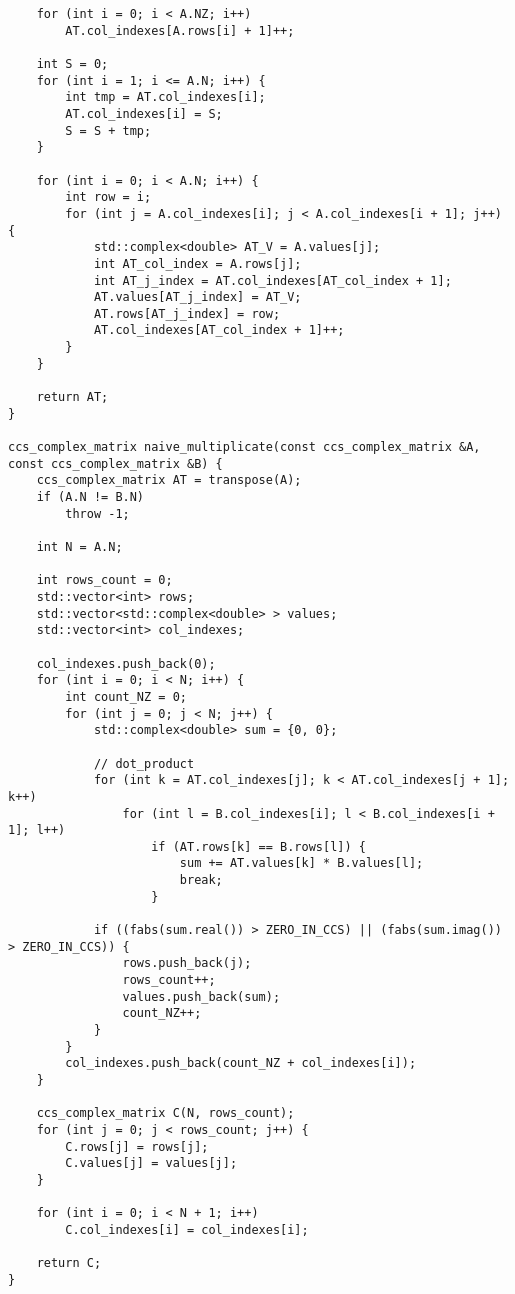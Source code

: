 \documentclass{report}
\begin{document}
\begin{itemize}
\begin{itemize}
\begin{lstlisting}
    for (int i = 0; i < A.NZ; i++)
        AT.col_indexes[A.rows[i] + 1]++;

    int S = 0;
    for (int i = 1; i <= A.N; i++) {
        int tmp = AT.col_indexes[i];
        AT.col_indexes[i] = S;
        S = S + tmp;
    }

    for (int i = 0; i < A.N; i++) {
        int row = i;
        for (int j = A.col_indexes[i]; j < A.col_indexes[i + 1]; j++) {
            std::complex<double> AT_V = A.values[j];
            int AT_col_index = A.rows[j];
            int AT_j_index = AT.col_indexes[AT_col_index + 1];
            AT.values[AT_j_index] = AT_V;
            AT.rows[AT_j_index] = row;
            AT.col_indexes[AT_col_index + 1]++;
        }
    }

    return AT;
}

ccs_complex_matrix naive_multiplicate(const ccs_complex_matrix &A, const ccs_complex_matrix &B) {
    ccs_complex_matrix AT = transpose(A);
    if (A.N != B.N)
        throw -1;

    int N = A.N;

    int rows_count = 0;
    std::vector<int> rows;
    std::vector<std::complex<double> > values;
    std::vector<int> col_indexes;

    col_indexes.push_back(0);
    for (int i = 0; i < N; i++) {
        int count_NZ = 0;
        for (int j = 0; j < N; j++) {
            std::complex<double> sum = {0, 0};

            // dot_product
            for (int k = AT.col_indexes[j]; k < AT.col_indexes[j + 1]; k++)
                for (int l = B.col_indexes[i]; l < B.col_indexes[i + 1]; l++)
                    if (AT.rows[k] == B.rows[l]) {
                        sum += AT.values[k] * B.values[l];
                        break;
                    }

            if ((fabs(sum.real()) > ZERO_IN_CCS) || (fabs(sum.imag()) > ZERO_IN_CCS)) {
                rows.push_back(j);
                rows_count++;
                values.push_back(sum);
                count_NZ++;
            }
        }
        col_indexes.push_back(count_NZ + col_indexes[i]);
    }

    ccs_complex_matrix C(N, rows_count);
    for (int j = 0; j < rows_count; j++) {
        C.rows[j] = rows[j];
        C.values[j] = values[j];
    }

    for (int i = 0; i < N + 1; i++)
        C.col_indexes[i] = col_indexes[i];

    return C;
}


\end{lstlisting}
\end{itemize}
\end{itemize}
\end{document}
